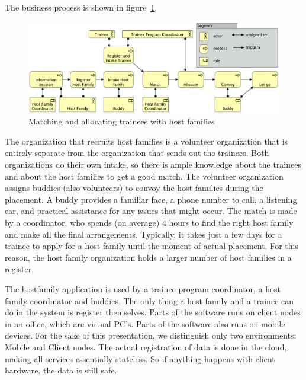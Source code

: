 \documentclass[sn-vancouver]{sn-jnl}%
\theoremstyle{thmstyleone}%
\theoremstyle{thmstyletwo}%
\theoremstyle{thmstylethree}%
\begin{document}
The business process is shown in figure~\ref{fig: Business Process voor Uitvoering}.
\begin{figure}[b]
\centering
  \includegraphics[clip=true, scale=0.245]{Business Process voor Uitvoering.png}
\caption{Matching and allocating trainees with host families}
\label{fig: Business Process voor Uitvoering}
\end{figure}
The organization that recruits host families is a volunteer organization that is entirely separate from the organization that sends out the trainees.
Both organizations do their own intake, so there is ample knowledge about the trainees and about the host families to get a good match.
The volunteer organization assigns buddies (also volunteers) to convoy the host families during the placement.
A buddy provides a familiar face, a phone number to call, a listening ear, and practical assistance for any issues that might occur.
The match is made by a coordinator, who spends (on average) 4 hours to find the right host family and make all the final arrangements.
Typically, it takes just a few days for a trainee to apply for a host family until the moment of actual placement.
For this reason, the host family organization holds a larger number of host families in a register.

The hostfamily application is used by a trainee program coordinator, a host family coordinator and buddies.
The only thing a host family and a trainee can do in the system is register themselves.
Parts of the software runs on client nodes in an office, which are virtual PC's.
Parts of the software also runs on mobile devices.
For the sake of this presentation, we distinguish only two environments: Mobile and Client nodes.
The actual registration of data is done in the cloud, making all services essentially stateless.
So if anything happens with client hardware, the data is still safe.
\end{document}
